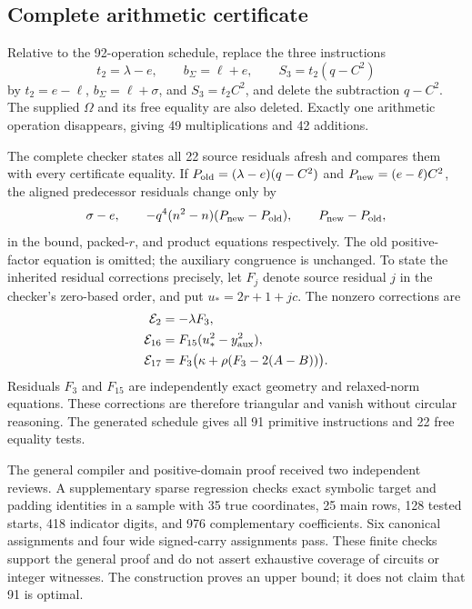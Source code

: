 \subsection{Complete arithmetic certificate}

Relative to the 92-operation schedule, replace the three instructions
\[
 t_2=\lambda-e,\qquad b_\Sigma=\ell+e,\qquad
 S_3=t_2(q-C^2)
\]
by $t_2=e-\ell$, $b_\Sigma=\ell+\sigma$, and $S_3=t_2C^2$,
and delete the subtraction $q-C^2$. The supplied $\Omega$ and its
free equality are also deleted. Exactly one arithmetic operation
disappears, giving 49 multiplications and 42 additions.

The complete checker states all 22 source residuals afresh and
compares them with every certificate equality. If
$P_{\rm old}=(\lambda-e)(q-C^2)$ and $P_{\rm new}=(e-\ell)C^2$,
the aligned predecessor residuals change only by
\begin{equation}\label{eq:product-bound-source-differences}
 \sigma-e,\qquad
 -q^4(n^2-n)(P_{\rm new}-P_{\rm old}),\qquad
 P_{\rm new}-P_{\rm old},
\end{equation}
in the bound, packed-$r$, and product equations respectively.
The old positive-factor equation is omitted; the auxiliary congruence
is unchanged. To state the inherited residual corrections precisely,
let $F_j$ denote source residual $j$ in the checker's zero-based order,
and put $u_*=2r+1+jc$. The nonzero corrections are
\[
\begin{aligned}
 \mathcal E_2&=-\lambda F_3,\\
 \mathcal E_{16}&=F_{15}(u_*^2-y_{\rm aux}^2),\\
 \mathcal E_{17}&=F_3\bigl(\kappa+
       \rho(F_3-2(A-B))\bigr).
\end{aligned}
\]
Residuals $F_3$ and $F_{15}$ are independently exact geometry and
relaxed-norm equations. These corrections are therefore triangular
and vanish without circular reasoning. The generated schedule gives
all 91 primitive instructions and 22 free equality tests.

The general compiler and positive-domain proof received two
independent reviews. A supplementary sparse regression checks exact
symbolic target and padding identities in a sample with 35 true
coordinates, 25 main rows, 128 tested starts, 418 indicator digits,
and 976 complementary coefficients. Six canonical assignments and
four wide signed-carry assignments pass. These finite checks support
the general proof and do not assert exhaustive coverage of circuits
or integer witnesses. The construction proves an upper bound; it
does not claim that 91 is optimal.
